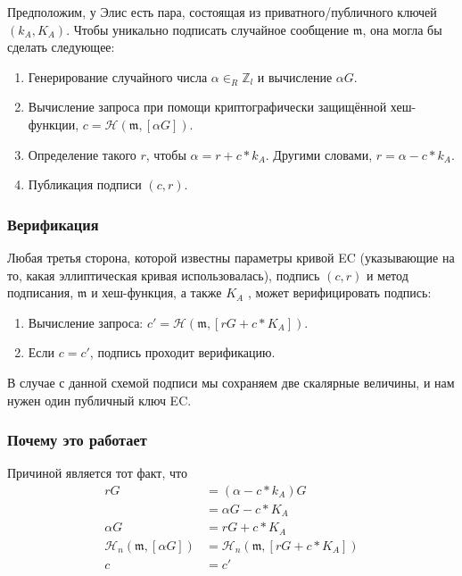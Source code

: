 Предположим, у Элис есть пара, состоящая из приватного/публичного ключей \((k_A, K_A)\). Чтобы уникально подписать случайное сообщение $\mathfrak{m}$, она могла бы сделать следующее:

\begin{enumerate}
	\item Генерирование случайного числа $\alpha \in_R \mathbb{Z}_l$ и вычисление $\alpha G$.
	\item Вычисление запроса при помощи криптографически защищённой хеш-функции, \(c = \mathcal{H}(\mathfrak{m},[\alpha G])\).
	\item Определение такого $r$, чтобы $\alpha = r + c*k_A$. Другими словами, $r = \alpha - c*k_A$.
	\item Публикация подписи $(c, r)$.
\end{enumerate}

\subsubsection*{Верификация}

Любая третья сторона, которой известны параметры кривой EC (указывающие на то, какая эллиптическая кривая использовалась), подпись $(c, r)$ и метод подписания, $\mathfrak{m}$ и хеш-функция, а также $K_A$ , может верифицировать подпись:

\begin{enumerate}
	\item Вычисление запроса: \(c' = \mathcal{H}(\mathfrak{m},[r G + c*K_A])\).
	\item Если $c = c'$, подпись проходит верификацию.
\end{enumerate}

В случае с данной схемой подписи мы сохраняем две скалярные величины, и нам нужен один публичный ключ EC.

\subsubsection*{Почему это работает}

Причиной является тот факт, что
\begin{align*}
  	 r G &= (\alpha - c*k_A) G \\
  	  	 &= \alpha G - c*K_A \\
\alpha G &= r G + c*K_A \\
\mathcal{H}_n(\mathfrak{m},[\alpha G]) &= \mathcal{H}_n(\mathfrak{m},[r G + c*K_A]) \\
       c &= c'
\end{align*}

